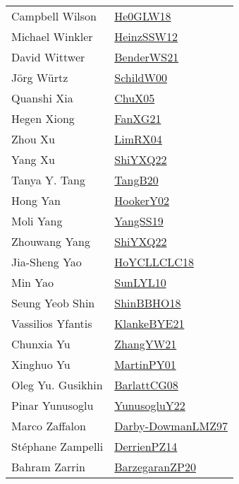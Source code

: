 {\begin{longtable}{p{4cm}p{20cm}}
Campbell Wilson & \href{papers/He0GLW18.pdf}{He0GLW18}\cite{He0GLW18} \\
Michael Winkler & \href{articles/HeinzSSW12.pdf}{HeinzSSW12}\cite{HeinzSSW12} \\
David Wittwer & \href{papers/BenderWS21.pdf}{BenderWS21}\cite{BenderWS21} \\
J{\"{o}}rg W{\"{u}}rtz & \href{articles/SchildW00.pdf}{SchildW00}\cite{SchildW00} \\
Quanshi Xia & \href{papers/ChuX05.pdf}{ChuX05}\cite{ChuX05} \\
Hegen Xiong & \href{articles/FanXG21.pdf}{FanXG21}\cite{FanXG21} \\
Zhou Xu & \href{papers/LimRX04.pdf}{LimRX04}\cite{LimRX04} \\
Yang Xu & \href{}{ShiYXQ22}\cite{ShiYXQ22} \\
Tanya Y. Tang & \href{papers/TangB20.pdf}{TangB20}\cite{TangB20} \\
Hong Yan & \href{papers/HookerY02.pdf}{HookerY02}\cite{HookerY02} \\
Moli Yang & \href{papers/YangSS19.pdf}{YangSS19}\cite{YangSS19} \\
Zhouwang Yang & \href{}{ShiYXQ22}\cite{ShiYXQ22} \\
Jia{-}Sheng Yao & \href{papers/HoYCLLCLC18.pdf}{HoYCLLCLC18}\cite{HoYCLLCLC18} \\
Min Yao & \href{papers/SunLYL10.pdf}{SunLYL10}\cite{SunLYL10} \\
Seung Yeob Shin & \href{articles/ShinBBHO18.pdf}{ShinBBHO18}\cite{ShinBBHO18} \\
Vassilios Yfantis & \href{papers/KlankeBYE21.pdf}{KlankeBYE21}\cite{KlankeBYE21} \\
Chunxia Yu & \href{articles/ZhangYW21.pdf}{ZhangYW21}\cite{ZhangYW21} \\
Xinghuo Yu & \href{articles/MartinPY01.pdf}{MartinPY01}\cite{MartinPY01} \\
Oleg Yu. Gusikhin & \href{papers/BarlattCG08.pdf}{BarlattCG08}\cite{BarlattCG08} \\
Pinar Yunusoglu & \href{}{YunusogluY22}\cite{YunusogluY22} \\
Marco Zaffalon & \href{articles/Darby-DowmanLMZ97.pdf}{Darby-DowmanLMZ97}\cite{Darby-DowmanLMZ97} \\
St{\'{e}}phane Zampelli & \href{papers/DerrienPZ14.pdf}{DerrienPZ14}\cite{DerrienPZ14} \\
Bahram Zarrin & \href{papers/BarzegaranZP20.pdf}{BarzegaranZP20}\cite{BarzegaranZP20} \\

\end{longtable}}
